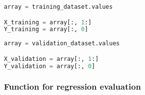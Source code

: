 \begin{lstlisting}[language=Python]
array = training_dataset.values

X_training = array[:, 1:]
Y_training = array[:, 0]
\end{lstlisting}

\begin{lstlisting}[language=Python]
array = validation_dataset.values

X_validation = array[:, 1:]
Y_validation = array[:, 0]
\end{lstlisting}

\hypertarget{function-for-regression-evaluation}{%
\subsubsection{Function for regression
evaluation}\label{function-for-regression-evaluation}}


